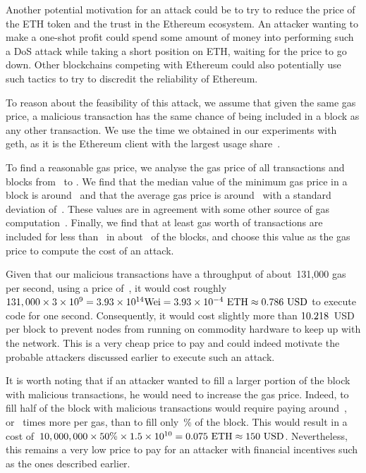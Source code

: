   Another potential motivation for an attack could be to try to reduce the price of the ETH token and the trust in the Ethereum ecosystem. An attacker wanting to make a one-shot profit could spend some amount of money into performing such a DoS attack while taking a short position on ETH, waiting for the price to go down. Other blockchains competing with Ethereum could also potentially use such tactics to try to discredit the reliability of Ethereum.

  To reason about the feasibility of this attack, we assume that given the same gas price, a malicious transaction has the same chance of being included in a block as any other transaction. We use the time we obtained in our experiments with geth, as it is the Ethereum client with the largest usage share~\cite{ehternodes}.

  To find a reasonable gas price, we analyse the gas price of all transactions and blocks from~ to . We find that the median value of the minimum gas price in a block is around~ and that the average gas price is around~ with a standard deviation of~. These values are in agreement with some other source of gas computation~\cite{eth-gas-station}. Finally, we find that at least  gas worth of transactions are included for less than~ in about~ of the blocks, and choose this value as the gas price to compute the cost of an attack.

  Given that our malicious transactions have a throughput of about~131,000 gas per second, using a price of~, it would cost roughly~$131,000 \times 3\times 10^9 = 3.93\times 10^{14} \text{Wei} = 3.93\times 10^{-4}~\text{ETH} \approx \fpeval{round(\ToUSD{0.000393}, 4)}~\text{USD}$ to execute code for one second. Consequently, it would cost slightly more than $\fpeval{round(\ToUSD{0.000393 * 13}, 3)}$~USD per block to prevent nodes from running on commodity hardware to keep up with the network. This is a very cheap price to pay and could indeed motivate the probable attackers discussed earlier to execute such an attack.

  It is worth noting that if an attacker wanted to fill a larger portion of the block with malicious transactions, he would need to increase the gas price. Indeed, to fill half of the block with malicious transactions would require paying around~, or~ times more per gas, than to fill only~\% of the block. This would result in a cost of~$10,000,000 \times 50\% \times 1.5\times 10^{10} = 0.075~\text{ETH} \approx \ToUSD{0.075}~\text{USD}$. Nevertheless, this remains a very low price to pay for an attacker with financial incentives such as the ones described earlier.


